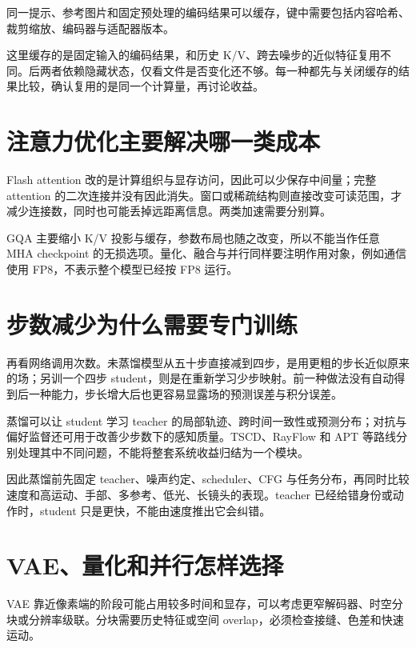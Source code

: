 同一提示、参考图片和固定预处理的编码结果可以缓存，键中需要包括内容哈希、裁剪缩放、编码器与适配器版本。

这里缓存的是固定输入的编码结果，和历史 K/V、跨去噪步的近似特征复用不同。后两者依赖隐藏状态，仅看文件是否变化还不够。每一种都先与关闭缓存的结果比较，确认复用的是同一个计算量，再讨论收益。

\section{注意力优化主要解决哪一类成本}\label{seedance-m10-ux6ce8ux610fux529bux4f18ux5316ux4e3bux8981ux89e3ux51b3ux54eaux4e00ux7c7bux6210ux672c}

Flash attention 改的是计算组织与显存访问，因此可以少保存中间量；完整 attention 的二次连接并没有因此消失。窗口或稀疏结构则直接改变可读范围，才减少连接数，同时也可能丢掉远距离信息。两类加速需要分别算。

GQA 主要缩小 K/V 投影与缓存，参数布局也随之改变，所以不能当作任意 MHA checkpoint 的无损选项。量化、融合与并行同样要注明作用对象，例如通信使用 FP8，不表示整个模型已经按 FP8 运行。

\section{步数减少为什么需要专门训练}\label{seedance-m10-ux6b65ux6570ux51cfux5c11ux4e3aux4ec0ux4e48ux9700ux8981ux4e13ux95e8ux8badux7ec3}

再看网络调用次数。未蒸馏模型从五十步直接减到四步，是用更粗的步长近似原来的场；另训一个四步 student，则是在重新学习少步映射。前一种做法没有自动得到后一种能力，步长增大后也更容易显露场的预测误差与积分误差。

蒸馏可以让 student 学习 teacher 的局部轨迹、跨时间一致性或预测分布；对抗与偏好监督还可用于改善少步数下的感知质量。TSCD、RayFlow 和 APT 等路线分别处理其中不同问题，不能将整套系统收益归结为一个模块。

因此蒸馏前先固定 teacher、噪声约定、scheduler、CFG 与任务分布，再同时比较速度和高运动、手部、多参考、低光、长镜头的表现。teacher 已经给错身份或动作时，student 只是更快，不能由速度推出它会纠错。

\section{VAE、量化和并行怎样选择}\label{seedance-m10-vaeux91cfux5316ux548cux5e76ux884cux600eux6837ux9009ux62e9}

VAE 靠近像素端的阶段可能占用较多时间和显存，可以考虑更窄解码器、时空分块或分辨率级联。分块需要历史特征或空间 overlap，必须检查接缝、色差和快速运动。

